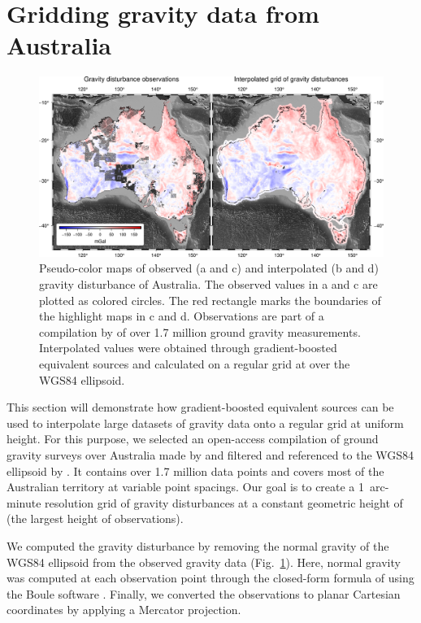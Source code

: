 
\section{Gridding gravity data from Australia}

\begin{figure}
    \includegraphics[width=\linewidth]{figs/australia.png}
    \caption{
      Pseudo-color maps of observed (a and c) and
      interpolated (b and d) gravity disturbance of Australia.
      The observed values in a and c are plotted as colored circles.
      The red rectangle marks the boundaries of the highlight maps in c
      and d.
      Observations are part of a compilation by \citet{wynne2018} of
      over 1.7 million ground gravity measurements.
      Interpolated values were obtained through gradient-boosted equivalent
      sources and calculated on a regular grid at \AustraliaEqlGridHeight{}
      over the WGS84 ellipsoid.
    }
    \label{fig:australia}
\end{figure}

This section will demonstrate how gradient-boosted equivalent sources can be
used to interpolate large datasets of gravity data onto a regular grid at
uniform height.
For this purpose, we selected an open-access compilation of ground gravity
surveys over Australia made by \citet{wynne2018} and filtered and referenced to
the WGS84 ellipsoid by \citet{australia_compilation}.
It contains over 1.7 million data points and covers most of the Australian
territory at variable point spacings.
Our goal is to create a 1~arc-minute resolution grid of gravity disturbances at
a constant geometric height of \AustraliaEqlGridHeight{} (the largest height of
observations).

We computed the gravity disturbance by removing the normal gravity of
the WGS84 ellipsoid from the observed gravity data (Fig.~\ref{fig:australia}).
Here, normal gravity was computed at each observation point through the
closed-form formula of \citet{ligotze2001} using the Boule software
\citep{boule2020}.
Finally, we converted the observations to planar Cartesian coordinates by
applying a Mercator projection.

